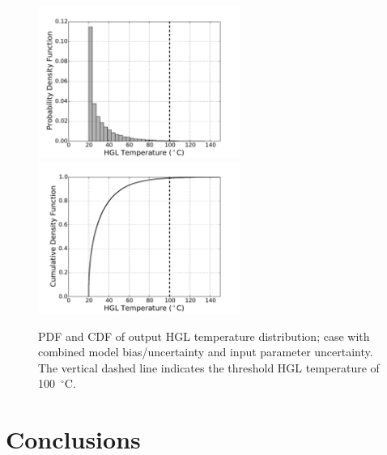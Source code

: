 \documentclass[12pt]{article}
\begin{document}
\begin{figure}[p]
\includegraphics[width=2.6in]{Figures/output_PDF_3_combined}
\includegraphics[width=2.6in]{Figures/output_CDF_3_combined}
\caption{PDF and CDF of output HGL temperature distribution; case with combined model bias/uncertainty and input parameter uncertainty. The vertical dashed line indicates the threshold HGL temperature of 100~$^\circ$C.}
\label{fig:case_3_output_distributions}
\end{figure}


\clearpage


\section{Conclusions}
\label{sec:conclusions}




\end{document}
